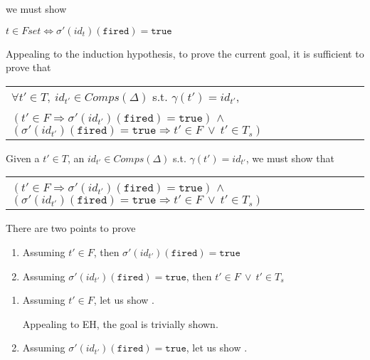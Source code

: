\documentclass[dvipsnames,12pt]{article}
\begin{document}
\begin{niproof}
\begin{itemize}
    we must show
    \begin{frameb}
      $t\in{}Fset\Leftrightarrow\sigma'(id_t)(\texttt{fired})=\mathtt{true}$
    \end{frameb}
    
    Appealing to the induction hypothesis, to prove the current goal,
    it is sufficient to prove that

    \begin{frameb}
      \begin{tabular}{l}
        $\forall{}t'\in{}T,~id_{t'}\in{}Comps(\Delta)$
        s.t. $\gamma(t')=id_{t'}$,\\
        $(t'\in{}F\Rightarrow\sigma'(id_{t'})(\texttt{fired})=\mathtt{true})$
        $\land$
        $(\sigma'(id_{t'})(\texttt{fired})=\mathtt{true}\Rightarrow{}t'\in{}F~\lor~{}t'\in{}T_s)$ \\
      \end{tabular}
    \end{frameb}

    Given a $t'\in{}T$, an $id_{t'}\in{}Comps(\Delta)$ s.t. $\gamma(t')=id_{t'}$, we must show that
    \begin{frameb}
      \begin{tabular}{l}
        $(t'\in{}F\Rightarrow\sigma'(id_{t'})(\texttt{fired})=\mathtt{true})$
        $\land$
        $(\sigma'(id_{t'})(\texttt{fired})=\mathtt{true}\Rightarrow{}t'\in{}F~\lor~{}t'\in{}T_s)$ \\
      \end{tabular}
    \end{frameb}

    There are two points to prove
    \begin{enumerate}
    \item Assuming $t'\in{}F$, then
      $\sigma'(id_{t'})(\texttt{fired})=\mathtt{true}$
    \item Assuming $\sigma'(id_{t'})(\texttt{fired})=\mathtt{true}$,
      then $t'\in{}F~\lor~{}t'\in{}T_s$
    \end{enumerate}

    \begin{enumerate}
    \item Assuming $t'\in{}F$, let us show
      .

      Appealing to EH, the goal is trivially shown.
      
    \item Assuming $\sigma'(id_{t'})(\texttt{fired})=\mathtt{true}$,
      let us show .


\end{enumerate}
\end{itemize}
\end{niproof}
\end{document}
